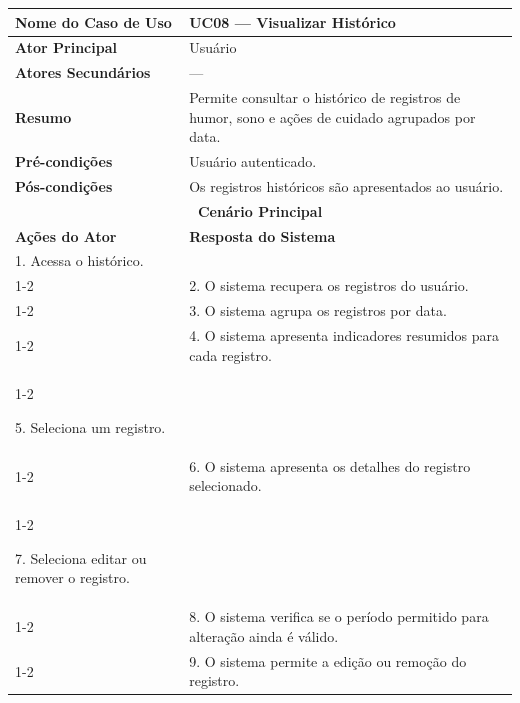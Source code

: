 
\begin{longtable}{| p{} | p{} |}
\hline

\textbf{Nome do Caso de Uso} &
UC08 --- Visualizar Histórico \\
\hline

\textbf{Ator Principal} &
Usuário \\
\hline

\textbf{Atores Secundários} &
--- \\
\hline

\textbf{Resumo} &
Permite consultar o histórico de registros de humor, sono e ações de
cuidado agrupados por data. \\
\hline

\textbf{Pré-condições} &
Usuário autenticado. \\
\hline

\textbf{Pós-condições} &
Os registros históricos são apresentados ao usuário. \\
\hline

\multicolumn{2}{|c|}{\textbf{Cenário Principal}}\\
\hline

\textbf{Ações do Ator} &
\textbf{Resposta do Sistema} \\
\hline

1. Acessa o histórico. & \\
\cline{1-2}

&
2. O sistema recupera os registros do usuário. \\
\cline{1-2}

&
3. O sistema agrupa os registros por data. \\
\cline{1-2}

&
4. O sistema apresenta indicadores resumidos para cada registro. \\
\cline{1-2}

5. Seleciona um registro. & \\
\cline{1-2}

&
6. O sistema apresenta os detalhes do registro selecionado. \\
\cline{1-2}

7. Seleciona editar ou remover o registro. & \\
\cline{1-2}

&
8. O sistema verifica se o período permitido para alteração ainda é
válido. \\
\cline{1-2}

&
9. O sistema permite a edição ou remoção do registro. \\
\hline


\end{longtable}
